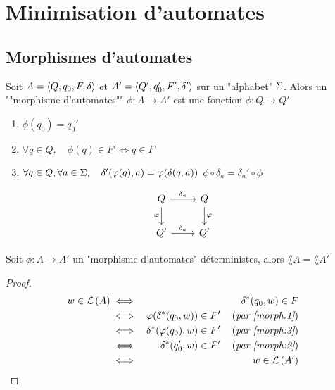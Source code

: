 \section{Minimisation d'automates}

\subsection{Morphismes d'automates}

\begin{definition}
	Soit $A = \langle Q, q_0, F, \delta \rangle$ et $ A' = \langle Q', q_0', F', \delta' \rangle $ sur un "alphabet" $\Sigma$.
	Alors un ""morphisme d'automates"" $\phi: A \to A'$ est une fonction $\phi: Q \to Q'$ \tlq
	\begin{enumerate}
		\item $\phi (q_0) = q_0'$ \label{morph:1}
		\item $\forall q \in Q,\quad  \phi (q) \in F' \iff q \in F$ \label{morph:2}
		\item $\forall q \in Q, \forall a \in \Sigma,\quad \delta'(\varphi (q), a) = \varphi (\delta(q,a))$ \ie $\phi \circ \delta_a = \delta_a '\circ \phi$ \label{morph:3}
	\end{enumerate}

	$$
		\begin{tikzcd}
			Q \arrow{r}{\delta_a} \arrow[swap]{d}{\phi} & Q \arrow{d}{\phi} \\
			Q' \arrow{r}{\delta_a} & Q'
		\end{tikzcd}
	$$

\end{definition}


\begin{exercice}
	Soit $\phi : A \to A'$ un "morphisme d'automates" déterministes, alors $\lang A = \lang {A'}$
\end{exercice}

\begin{proof}
	\begin{eqnarray*}
		w \in \mathcal{L}\left(A\right) &\iff& \delta^{*} (q_0, w) \in F \\
		&\iff& \varphi (\delta^{*} (q_0, w)) \in F' \quad\left(\textit{par \ref{morph:1}}\right)\\
		&\iff& \delta^{*}( \varphi (q_0), w) \in F' \quad\left(\textit{par \ref{morph:3}}\right)\\
		&\iff& \delta^{*}( q_0', w) \in F' \quad\left(\textit{par \ref{morph:2}}\right)\\
		&\iff& w \in \mathcal{L}\left(A'\right)
	\end{eqnarray*}
\end{proof}


